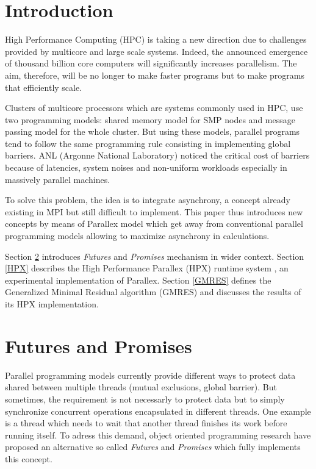 \documentclass[conference]{acmsig-alternate-10pt}
\begin{document}

\section{Introduction}\label{Introduction}
High Performance Computing (HPC) is taking a new direction due to challenges provided by multicore and large scale systems. Indeed, the announced emergence of thousand billion core computers will significantly increases parallelism. The aim, therefore, will be no longer to make faster programs but to make programs that efficiently scale.\smallskip 

Clusters of multicore processors which are systems commonly used in HPC, use two programming models: shared memory model for SMP nodes and message passing model for the whole cluster. But using these models, parallel programs tend to follow the same programming rule consisting in implementing global barriers. ANL (Argonne National Laboratory) noticed the critical cost of barriers because of latencies, system noises and non-uniform workloads especially in massively parallel machines.\smallskip 

To solve this problem, the idea is to integrate asynchrony, a concept already existing in MPI but still difficult to implement. This paper thus introduces new concepts by means of Parallex model which get away from conventional parallel programming models allowing to maximize asynchrony in calculations.\smallskip

Section \ref{Futures} introduces \emph{Futures} and \emph{Promises} mechanism in wider context. Section \ref{HPX} describes the High Performance Parallex (HPX) runtime system \cite{Parallex}, an experimental implementation of Parallex. Section \ref{GMRES} defines the Generalized Minimal Residual algorithm (GMRES) \cite{GMRES} and discusses the results of its HPX implementation.

\section{Futures and Promises}\label{Futures}
Parallel programming models currently provide different ways to protect data shared between multiple threads (mutual exclusions, global barrier). But sometimes, the requirement is not necessarly to protect data but to simply synchronize concurrent operations encapsulated in different threads. One example is a thread which needs to wait that another thread finishes its work before running itself. To adress this demand, object oriented programming research have proposed an alternative so called \emph{Futures} and \emph{Promises} \cite{Futures1} \cite{Futures2} which fully implements this concept.
\end{document}
